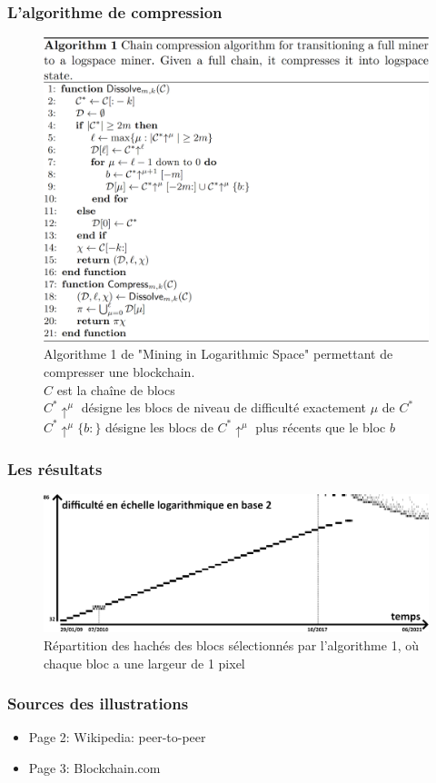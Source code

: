 \documentclass{beamer}
\begin{document}
\begin{frame}

\frametitle{L'algorithme de compression}

\begin{figure}[H]
		\includegraphics[width=0.7\linewidth]{illustrations/algo1.png}
		\caption{Algorithme 1 de "Mining in Logarithmic Space" permettant de compresser une blockchain.\\$C$ est la chaîne de blocs\\$C^*\uparrow^\mu$ désigne les blocs de niveau de difficulté exactement $\mu$ de $C^*$\\$C^*\uparrow^\mu\{b:\}$ désigne les blocs de $C^*\uparrow^\mu$ plus récents que le bloc $b$}
	\end{figure}

\end{frame}


\begin{frame}

\frametitle{Les résultats}

\begin{figure}[H]
		\includegraphics[width=\linewidth]{illustrations/piX.png}
		\caption{Répartition des hachés des blocs sélectionnés par l'algorithme 1, où chaque bloc a une largeur de 1 pixel}%
	\end{figure}

\end{frame}


\begin{frame}

\frametitle{Sources des illustrations}

	\begin{itemize}
		\item Page 2: Wikipedia: peer-to-peer
		\item Page 3: Blockchain.com
	\end{itemize}
\end{frame}
\end{document}
